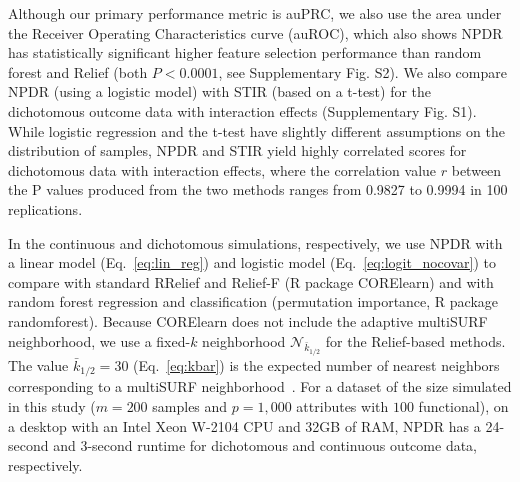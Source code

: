 \documentclass{bioinfo}
\begin{document}

Although our primary performance metric is auPRC, we also use the area under the Receiver Operating Characteristics curve (auROC), which also shows NPDR has statistically significant higher feature selection performance than random forest and Relief (both $P < 0.0001$, see Supplementary Fig. S2).
We also compare NPDR (using a logistic model) with STIR (based on a t-test) for the dichotomous outcome data with interaction effects (Supplementary Fig. S1).
While logistic regression and the t-test have slightly different assumptions on the distribution of samples, NPDR and STIR yield highly correlated scores for dichotomous data with interaction effects, where the correlation value $r$ between the P values produced from the two methods ranges from 0.9827 to 0.9994 in 100 replications.

In the continuous and dichotomous simulations, respectively, we use NPDR with a linear model (Eq.~\ref{eq:lin_reg}) and logistic model (Eq.~\ref{eq:logit_nocovar}) to compare with standard RRelief and Relief-F (R package CORElearn) and with random forest regression and classification (permutation importance, R package randomforest).
Because CORElearn does not include the adaptive multiSURF neighborhood, we use a fixed-$k$ neighborhood $\mathcal{N}_{\bar{k}_{1/2}}$ for the Relief-based methods.
The value $\bar{k}_{1/2}=30$ (Eq.~\ref{eq:kbar}) is the expected number of nearest neighbors corresponding to a multiSURF neighborhood~\cite{bod}.
For a dataset of the size simulated in this study ($m = 200$ samples and $p = 1,000$ attributes with $100$ functional), on a desktop with an Intel Xeon W-2104 CPU and 32GB of RAM, NPDR has a 24-second and 3-second runtime for dichotomous and continuous outcome data, respectively.
\end{document}
